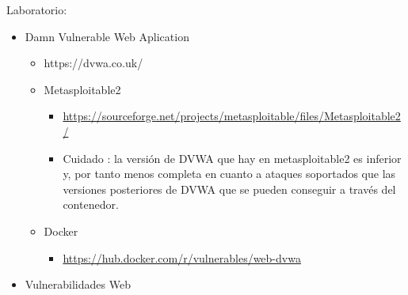 \documentclass[aspectratio=169,10pt]{beamer}
\begin{document}
\begin{frame}[allowframebreaks]{Laboratorio:}
\small
  \begin{itemize}
  \item Damn Vulnerable Web Aplication
    \begin{itemize}
    \item https://dvwa.co.uk/
    \item Metasploitable2
      \begin{itemize}
      \item \href{https://sourceforge.net/projects/metasploitable/files/Metasploitable2/}{https://sourceforge.net/projects/metasploitable/files/Metasploitable2/}
      \item Cuidado : la versión de DVWA que hay en metasploitable2 es inferior y, por tanto menos completa en cuanto a ataques soportados que las versiones posteriores de DVWA que se pueden conseguir a través del contenedor.
      \end{itemize}
    \item Docker
      \begin{itemize}
      \item \href{https://hub.docker.com/r/vulnerables/web-dvwa}{https://hub.docker.com/r/vulnerables/web-dvwa}
      \end{itemize}
    \end{itemize}
  \item Vulnerabilidades Web
  \end{itemize}
\end{frame}
\end{document}
